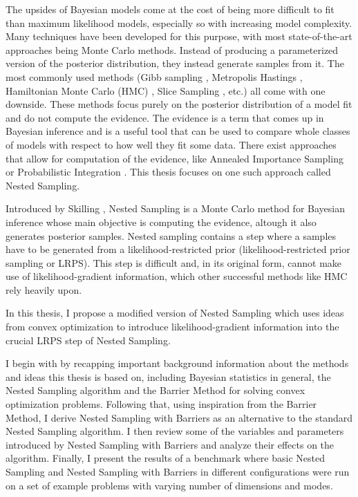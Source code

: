 \documentclass[12pt, a4paper]{report}
\begin{document}
The upsides of Bayesian models come at the cost of being more difficult to fit than maximum likelihood models, especially so with increasing model complexity.
Many techniques have been developed for this purpose, with most state-of-the-art approaches being Monte Carlo methods.
Instead of producing a parameterized version of the posterior distribution, they instead generate samples from it.
The most commonly used methods (Gibb sampling \cite{gibbs}, Metropolis Hastings \cite{metropolishastings}, Hamiltonian Monte Carlo (HMC) \cite{hmc}, Slice Sampling \cite{slice_sampling}, etc.) all come with one downside.
These methods focus purely on the posterior distribution of a model fit and do not compute the evidence.
The evidence is a term that comes up in Bayesian inference and is a useful tool that can be used to compare whole classes of models with respect to how well they fit some data.
There exist approaches that allow for computation of the evidence, like Annealed Importance Sampling \cite{annealed_importance_sampling} or Probabilistic Integration \cite{bayesian_cubature}.
This thesis focuses on one such approach called Nested Sampling.

Introduced by Skilling \cite{skilling}, Nested Sampling is a Monte Carlo method for Bayesian inference whose main objective is computing the evidence, altough it also generates posterior samples.
Nested sampling contains a step where a samples have to be generated from a likelihood-restricted prior (likelihood-restricted prior sampling or LRPS).
This step is difficult \cite[9]{hmc_in_ns} and, in its original form, cannot make use of likelihood-gradient information, which other successful methods like HMC rely heavily upon.

In this thesis, I propose a modified version of Nested Sampling which uses ideas from convex optimization to introduce likelihood-gradient information into the crucial LRPS step of Nested Sampling.

I begin with by recapping important background information about the methods and ideas this thesis is based on, including Bayesian statistics in general, the Nested Sampling algorithm and the Barrier Method for solving convex optimization problems.
Following that, using inspiration from the Barrier Method, I derive Nested Sampling with Barriers as an alternative to the standard Nested Sampling algorithm.
I then review some of the variables and parameters introduced by Nested Sampling with Barriers and analyze their effects on the algorithm.
Finally, I present the results of a benchmark where basic Nested Sampling and Nested Sampling with Barriers in different configurations were run on a set of example problems with varying number of dimensions and modes.
\setcounter{page}{5}
\end{document}
